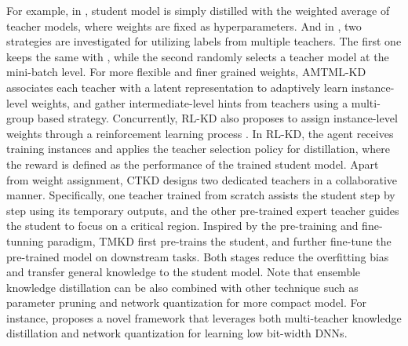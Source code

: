 For example, in \cite{chebotar2016distilling}, student model is simply distilled with the weighted average of teacher models, where weights are fixed as hyperparameters.  And in \cite{fukuda2017efficient}, two strategies are investigated for utilizing labels from multiple teachers. The first one keeps the same with \cite{chebotar2016distilling}, while the second randomly selects a teacher model at the mini-batch level. For more flexible and finer grained weights, AMTML-KD \cite{liu2020adaptive} associates each teacher with a latent representation to adaptively learn instance-level weights, and gather intermediate-level hints from teachers using a multi-group based strategy. Concurrently, RL-KD also proposes to assign instance-level weights through a reinforcement learning process \cite{yuan2021reinforced}. In RL-KD, the agent receives training instances and applies the teacher selection policy for distillation, where the reward is defined as the performance of the trained student model. Apart from weight assignment, CTKD \cite{zhao2020highlight} designs two dedicated teachers in a collaborative manner. Specifically, one teacher trained from scratch assists the student step by step using its temporary outputs, and the other pre-trained expert teacher guides the student to focus on a critical region. Inspired by the pre-training and fine-tunning paradigm, TMKD \cite{yang2020model} first pre-trains the student, and further fine-tune the pre-trained model on downstream tasks. Both stages reduce the overfitting bias and transfer general knowledge to the student model. 
Note that ensemble knowledge distillation can be also combined with other technique such as parameter pruning and network quantization for more compact model. For instance, \cite{pham2023collaborative} proposes a novel framework that leverages both multi-teacher knowledge distillation and network quantization for learning low bit-width DNNs.




